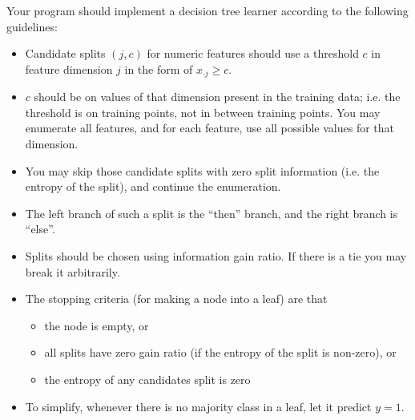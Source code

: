 \documentclass[a4paper]{article}
\theoremstyle{definition}
\begin{document}
Your program should implement a decision tree learner according to the following guidelines:
\begin{itemize}
\item Candidate splits $(j,c)$ for numeric features should use a threshold $c$ in feature dimension $j$ in the form of $x_{\cdot j}\ge c$.
\item $c$ should be on values of that dimension present in the training data; i.e. the threshold is on training points, not in between training points. You may enumerate all features, and for each feature, use all possible values for that dimension.
\item You may skip those candidate splits with zero split information (i.e. the entropy of the split), and continue the enumeration.
\item The left branch of such a split is the ``then'' branch, and the right branch is ``else''.
\item Splits should be chosen using information gain ratio. If there is a tie you may break it arbitrarily.
\item The stopping criteria (for making a node into a leaf) are that 
	\begin{itemize}
	\item the node is empty, or
	\item all splits have zero gain ratio (if the entropy of the split is non-zero), or
	\item the entropy of any candidates split is zero
	\end{itemize}
\item To simplify, whenever there is no majority class in a leaf, let it predict $y=1$.
\end{itemize}
\end{document}
